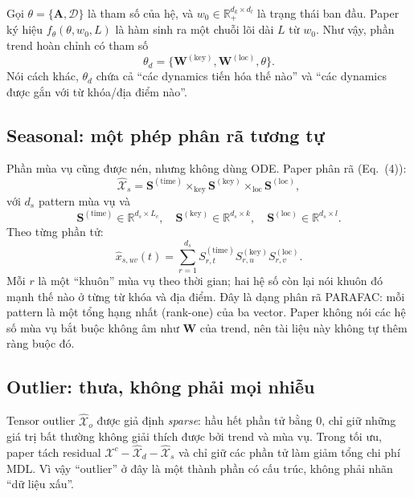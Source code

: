 Gọi $\theta=\{\mathbf{A},\mathcal{D}\}$ là tham số của hệ, và $w_0\in\mathbb{R}_{+}^{d_k\times d_l}$
là trạng thái ban đầu. Paper ký hiệu $f_\theta(\theta,w_0,L)$ là hàm sinh ra một chuỗi lõi dài $L$
từ $w_0$. Như vậy, phần trend hoàn chỉnh có tham số
\[
  \theta_d=\{\mathbf{W}^{(\mathrm{key})},\mathbf{W}^{(\mathrm{loc})},\theta\}.
\]
Nói cách khác, $\theta_d$ chứa cả ``các dynamics tiến hóa thế nào'' và ``các dynamics được gắn
với từ khóa/địa điểm nào''.

\subsection{Seasonal: một phép phân rã tương tự}

Phần mùa vụ cũng được nén, nhưng không dùng ODE. Paper phân rã (Eq.~(4)):
\begin{equation}
  \widehat{\mathcal{X}}_s
  =\mathbf{S}^{(\mathrm{time})}
   \times_{\mathrm{key}}\mathbf{S}^{(\mathrm{key})}
   \times_{\mathrm{loc}}\mathbf{S}^{(\mathrm{loc})},
  \label{eq:seasonal-factorization}
\end{equation}
với $d_s$ pattern mùa vụ và
\[
  \mathbf{S}^{(\mathrm{time})}\in\mathbb{R}^{d_s\times L_c},
  \quad
  \mathbf{S}^{(\mathrm{key})}\in\mathbb{R}^{d_s\times k},
  \quad
  \mathbf{S}^{(\mathrm{loc})}\in\mathbb{R}^{d_s\times l}.
\]
Theo từng phần tử:
\begin{equation}
  \widehat{x}_{s,uv}(t)
  =\sum_{r=1}^{d_s}
    S^{(\mathrm{time})}_{r,t}S^{(\mathrm{key})}_{r,u}S^{(\mathrm{loc})}_{r,v}.
  \label{eq:seasonal-elementwise}
\end{equation}
Mỗi $r$ là một ``khuôn'' mùa vụ theo thời gian; hai hệ số còn lại nói khuôn đó mạnh thế nào ở từng
từ khóa và địa điểm. Đây là dạng phân rã PARAFAC: mỗi pattern là một tổng hạng nhất (rank-one) của
ba vector. Paper không nói các hệ số mùa vụ bắt buộc không âm như $\mathbf{W}$ của trend, nên tài
liệu này không tự thêm ràng buộc đó.

\subsection{Outlier: thưa, không phải mọi nhiễu}

Tensor outlier $\widehat{\mathcal{X}}_o$ được giả định \emph{sparse}: hầu hết phần tử bằng 0, chỉ
giữ những giá trị bất thường không giải thích được bởi trend và mùa vụ. Trong tối ưu, paper tách
residual $\mathcal{X}^{c}-\widehat{\mathcal{X}}_d-\widehat{\mathcal{X}}_s$ và chỉ giữ các phần tử
làm giảm tổng chi phí MDL. Vì vậy ``outlier'' ở đây là một thành phần có cấu trúc, không phải
nhãn ``dữ liệu xấu''.

